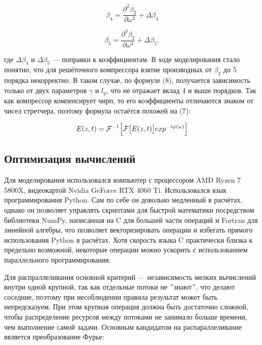 \documentclass[12pt]{article}
\begin{document}
\begin{equation}
    \beta_4 = \frac{\partial^2 \beta_2}{\partial \omega^2} + \Delta \beta_4
\end{equation}

\begin{equation}
    \beta_5 = \frac{\partial^3 \beta_2}{\partial \omega^3} + \Delta \beta_5,
\end{equation}

где $\Delta \beta_4$ и $\Delta \beta_5$ — поправки к коэффициентам. В ходе моделирования стало понятно, что для
решёточного компрессора взятие производных от $\beta_2$ до 5 порядка некорректно. В таком случае, по формуле (8),
получается зависимость только от двух параметров $\gamma$ и $l_g$, что не отражает вклад 4 и выше порядков. Так как
компрессор компенсирует чирп, то его коэффициенты отличаются знаком от чисел стретчера, поэтому формула остаётся
похожей на (7):

\begin{equation}
    E(z, t) = \mathcal{F}^{-1} \Bigl[ \mathcal{F} \bigl[ E(z, t) \bigr] exp^{-i\varphi(\omega)} \Bigr]
\end{equation}

\subsection{Оптимизация вычислений}

Для моделирования использовался компьютер с процессором AMD Ryzen 7 5800X, видеокартой Nvidia GeForce RTX 4060 Ti.
Использовался язык программирования Python. Сам по себе он довольно медленный в расчётах, однако он позволяет
управлять скриптами для быстрой математики посредством библиотеки NumPy, написанная на C для большей части операций
и Fortran для линейной алгебры, что позволяет векторизировать операции и избегать прямого использования Python
в расчётах. Хотя скорость языка C практически близка к предельно возможной, некоторые операции можно ускорить
с использованием параллельного программирования.

Для распраллеливания основной критерий — независимость мелких вычислений внутри одной крупной, так как отдельные
потоки не \("\)знают\("\), что делают соседние, поэтому при несоблюдении правила результат может быть непредсказуем.
При этом крупная операция должна быть достаточно сложной, чтобы распределение ресурсов между потоками не занимало
больше времени, чем выполнение самой задачи. Основным кандидатом на распараллеливание является преобразование Фурье:
\end{document}

